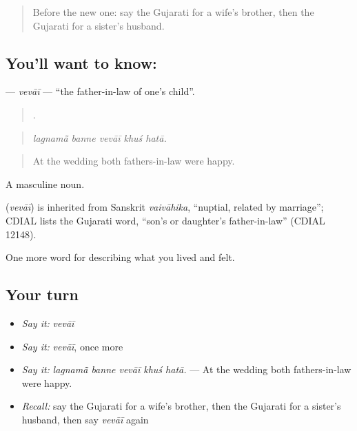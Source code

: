 \label{lesson:GU-C491-vevai}



\begin{quote}
Before the new one: say the Gujarati for a wife's brother, then the Gujarati for a sister's husband.
\end{quote}

\subsection*{You'll want to know: }
\textbf{} — \emph{vevāī} — \textquotedblleft{}the father-in-law of one's child\textquotedblright{}.

\begin{quote}
    .
\end{quote}

\begin{quote}
\emph{lagnamā̃ banne vevāī khuś hatā.}
\end{quote}

\begin{quote}
At the wedding both fathers-in-law were happy.
\end{quote}

A masculine noun.

\begin{cousinweb}
\textbf{} (\emph{vevāī}) is inherited from Sanskrit \emph{vaivāhika}, \textquotedblleft{}nuptial, related by marriage\textquotedblright{}; CDIAL lists the Gujarati word, \textquotedblleft{}son's or daughter's father-in-law\textquotedblright{} (CDIAL 12148).
\end{cousinweb}

\begin{grammarlens}[title={What you've built}]
One more word for describing what you lived and felt.
\end{grammarlens}

\subsection*{Your turn}
\begin{itemize}
\raggedright
  \item \emph{Say it:} \emph{vevāī}
  \item \emph{Say it:} \emph{vevāī}, once more
  \item \emph{Say it:} \emph{lagnamā̃ banne vevāī khuś hatā.} — At the wedding both fathers-in-law were happy.
  \item \emph{Recall:} say the Gujarati for a wife's brother, then the Gujarati for a sister's husband, then say \emph{vevāī} again
\end{itemize}

